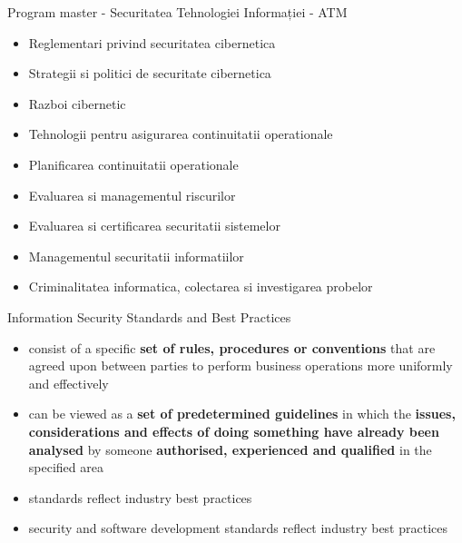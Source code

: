 \documentclass[pdf]{beamer}
\begin{document}
\begin{frame}{Program master - Securitatea Tehnologiei Informației - ATM}
\begin{itemize}
\item
Reglementari privind securitatea cibernetica

\item
Strategii si politici de securitate cibernetica

\item
Razboi cibernetic

\item
Tehnologii pentru asigurarea continuitatii operationale

\item
Planificarea continuitatii operationale

\item
Evaluarea si managementul riscurilor

\item
Evaluarea si certificarea securitatii sistemelor

\item
Managementul securitatii informatiilor

\item
Criminalitatea informatica, colectarea si investigarea probelor

\end{itemize}
\end{frame}



\begin{frame}{Information Security Standards and Best Practices}
\begin{itemize}
\item
consist of a specific \textbf{set of rules, procedures or conventions} that are agreed upon between parties to perform business operations more uniformly and effectively

\item
can be viewed as a \textbf{set of predetermined guidelines} in
which the \textbf{issues, considerations and effects of doing something have already been analysed} by someone \textbf{authorised, experienced and qualified} in the specified area

\item
standards reflect industry best practices

\item
security and software development standards reflect industry best practices

\end{itemize}
\end{frame}
\end{document}
